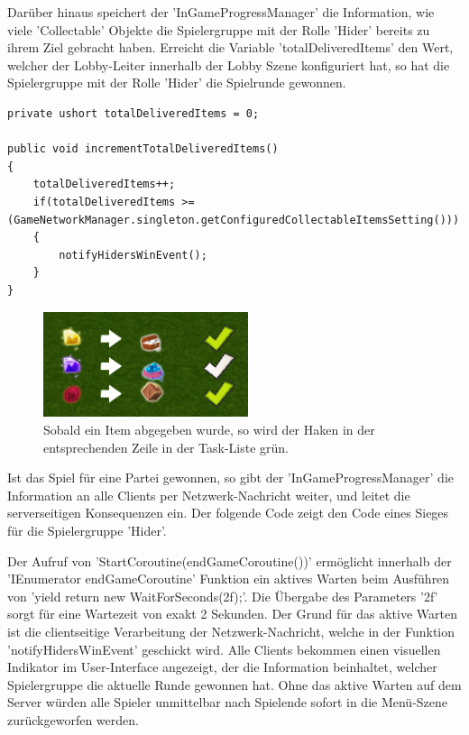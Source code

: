 Darüber hinaus speichert der 'InGameProgressManager' die Information, wie viele 'Collectable' Objekte die Spielergruppe mit der Rolle 'Hider' bereits zu ihrem Ziel gebracht haben. Erreicht die Variable 'totalDeliveredItems' den Wert, welcher der Lobby-Leiter innerhalb der Lobby Szene konfiguriert hat, so hat die Spielergruppe mit der Rolle 'Hider' die Spielrunde gewonnen.

\begin{lstlisting}[caption= InGameProgressManager.cs Item Devlivery Handling]
private ushort totalDeliveredItems = 0;

public void incrementTotalDeliveredItems()
{
	totalDeliveredItems++;
	if(totalDeliveredItems >= (GameNetworkManager.singleton.getConfiguredCollectableItemsSetting()))
	{
		notifyHidersWinEvent();
	}
}	
\end{lstlisting}

\begin{figure}[H]
	\centering
	\includegraphics[width=60mm]{images/prototyp_task_list_progress.png}
	\caption[Updated Task List]{Sobald ein Item abgegeben wurde, so wird der Haken in der entsprechenden Zeile in der Task-Liste grün.}
	\label{pic:prototyp_task_list_progress}
\end{figure}

Ist das Spiel für eine Partei gewonnen, so gibt der 'InGameProgressManager' die Information an alle Clients per Netzwerk-Nachricht weiter, und leitet die serverseitigen Konsequenzen ein. Der folgende Code zeigt den Code eines Sieges für die Spielergruppe 'Hider'. 

Der Aufruf von 'StartCoroutine(endGameCoroutine())' ermöglicht innerhalb der 'IEnumerator endGameCoroutine' Funktion ein aktives Warten beim Ausführen von 'yield return new WaitForSeconds(2f);'. Die Übergabe des Parameters '2f' sorgt für eine Wartezeit von exakt 2 Sekunden. Der Grund für das aktive Warten ist die clientseitige Verarbeitung der Netzwerk-Nachricht, welche in der Funktion 'notifyHidersWinEvent' geschickt wird. Alle Clients bekommen einen visuellen Indikator im User-Interface angezeigt, der die Information beinhaltet, welcher Spielergruppe die aktuelle Runde gewonnen hat. Ohne das aktive Warten auf dem Server würden alle Spieler unmittelbar nach Spielende sofort in die Menü-Szene zurückgeworfen werden.

